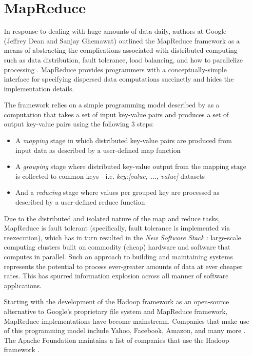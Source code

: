 \section{MapReduce}
In response to dealing with huge amounts of data daily, authors at Google (Jeffrey Dean and Sanjay Ghemawat) outlined the MapReduce framework as a means of abstracting the complications associated with distributed computing such as data distribution, fault tolerance, load balancing, and how to parallelize processing \cite{Dean:2008}. MapReduce provides programmers with a conceptually-simple interface for specifying dispersed data computations succinctly and hides the implementation details.

The framework relies on a simple programming model described by \cite{Dean:2008} as a computation that takes a set of input key-value pairs and produces a set of output key-value pairs using the following 3 steps:

\begin{itemize}
    \item A \textit{mapping} stage in which distributed key-value pairs are produced from input data as described by a user-defined map function
    \item A \textit{grouping} stage where distributed key-value output from the mapping stage is collected to common keys - i.e. \textit{key:[value, ..., value]} datasets
    \item And a \textit{reducing} stage where values per grouped key are processed as described by a user-defined reduce function
\end{itemize}

Due to the distributed and isolated nature of the map and reduce tasks, MapReduce is fault tolerant (specifically, fault tolerance is implemented via reexecution), which has in turn resulted in the \textit{New Software Stack} \cite{mining2011}: large-scale computing clusters built on commodity (cheap) hardware and software that computes in parallel. Such an approach to building and maintaining systems represents the potential to process ever-greater amounts of data at ever cheaper rates. This has spurred information explosion across all manner of software applications.

Starting with the development of the Hadoop framework as an open-source alternative to Google's proprietary file system and MapReduce framework, MapReduce implementations have become mainstream. Companies that make use of this programming model include Yahoo, Facebook, Amazon, and many more \cite{chandar2010}. The Apache Foundation maintains a list of companies that use the Hadoop framework \cite{hadoopPower:2017}.


